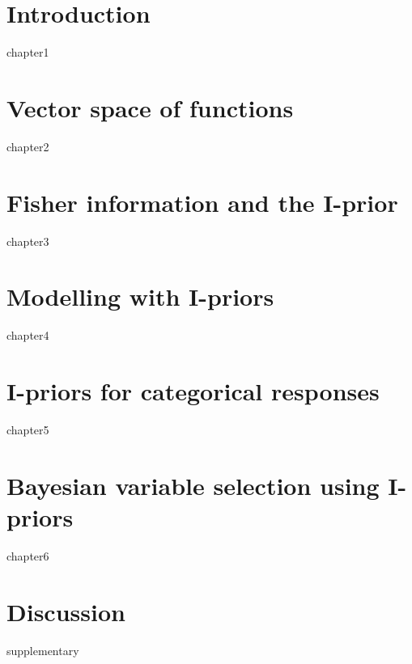 \documentclass[a4paper,showframe,11pt]{report}
\begin{document}
\hTOCandLists
{}
\clearpage


\chapter{Introduction} 
{chapter1}

\chapter{Vector space of functions}
{chapter2}

\chapter{Fisher information and the I-prior}
{chapter3}

\chapter{Modelling with I-priors}
{chapter4}

\chapter{I-priors for categorical responses}
{chapter5}

\chapter{Bayesian variable selection using I-priors}
{chapter6}

\chapter{Discussion}


{supplementary}
\end{document}
